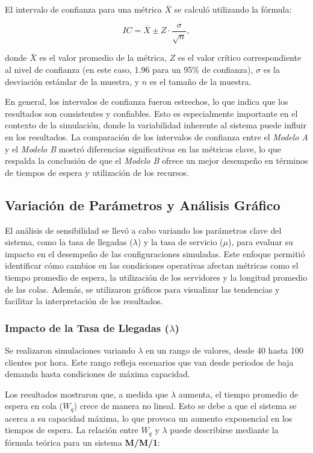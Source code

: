 \documentclass[a4paper,12pt]{article}
\begin{document}
El intervalo de confianza para una métrica \( \bar{X} \) se calculó utilizando la fórmula:

\[
IC = \bar{X} \pm Z \cdot \frac{\sigma}{\sqrt{n}},
\]

donde \( \bar{X} \) es el valor promedio de la métrica, \( Z \) es el valor crítico correspondiente al nivel de confianza (en este caso, 1.96 para un 95\% de confianza), \( \sigma \) es la desviación estándar de la muestra, y \( n \) es el tamaño de la muestra.

En general, los intervalos de confianza fueron estrechos, lo que indica que los resultados son consistentes y confiables. Esto es especialmente importante en el contexto de la simulación, donde la variabilidad inherente al sistema puede influir en los resultados. La comparación de los intervalos de confianza entre el \textit{Modelo A} y el \textit{Modelo B} mostró diferencias significativas en las métricas clave, lo que respalda la conclusión de que el \textit{Modelo B} ofrece un mejor desempeño en términos de tiempos de espera y utilización de los recursos.

\subsection{Variación de Parámetros y Análisis Gráfico}

El análisis de sensibilidad se llevó a cabo variando los parámetros clave del sistema, como la tasa de llegadas (\( \lambda \)) y la tasa de servicio (\( \mu \)), para evaluar su impacto en el desempeño de las configuraciones simuladas. Este enfoque permitió identificar cómo cambios en las condiciones operativas afectan métricas como el tiempo promedio de espera, la utilización de los servidores y la longitud promedio de las colas. Además, se utilizaron gráficos para visualizar las tendencias y facilitar la interpretación de los resultados.

\subsubsection{Impacto de la Tasa de Llegadas (\( \lambda \))}
Se realizaron simulaciones variando \( \lambda \) en un rango de valores, desde 40 hasta 100 clientes por hora. Este rango refleja escenarios que van desde periodos de baja demanda hasta condiciones de máxima capacidad.

Los resultados mostraron que, a medida que \( \lambda \) aumenta, el tiempo promedio de espera en cola (\( W_q \)) crece de manera no lineal. Esto se debe a que el sistema se acerca a su capacidad máxima, lo que provoca un aumento exponencial en los tiempos de espera. La relación entre \( W_q \) y \( \lambda \) puede describirse mediante la fórmula teórica para un sistema \textbf{M/M/1}:
\end{document}
